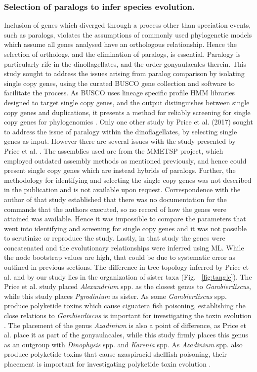 \documentclass[12pt]{article}
\begin{document}
\subsubsection*{Selection of paralogs to infer species evolution.}
\FloatBarrier
Inclusion of genes which diverged through a process other than speciation events, such as paralogs, violates the assumptions of commonly used phylogenetic models which assume all genes analysed have an orthologous relationship.
Hence the selection of orthologs, and the elimination of paralogs, is essential.
Paralogy is particularly rife in the dinoflagellates, and the order gonyaulacales therein. 
This study sought to address the issues arising from paralog comparison by isolating single copy genes, using the curated BUSCO gene collection and software to facilitate the process. 
As BUSCO uses lineage specific profile HMM libraries designed to target single copy genes, and the output distinguishes between single copy genes and duplications, it presents a method for reliably screening for single copy genes for phylogenomics \cite{waterhouse2017busco}.
Only one other study by Price et al. (2017) sought to address the issue of paralogy within the dinoflagellates, by selecting single genes as input. 
However there are several issues with the study presented by Price et al. \cite{price2017robust}. 
The assemblies used are from the MMETSP project, which employed outdated assembly methods as mentioned previously, and hence could present single copy genes which are instead hybrids of paralogs. 
Further, the methodology for identifying and selecting the single copy genes was not described in the publication and is not available upon request. 
Correspondence with the author of that study established that there was no documentation for the commands that the authors executed, so no record of how the genes were attained was available. 
Hence it was impossible to compare the parameters that went into identifying and screening for single copy genes and it was not possible to scrutinize or reproduce the study.
Lastly, in that study the genes were concatenated and the evolutionary relationships were inferred using ML. 
While the node bootstrap values are high, that could be due to systematic error as outlined in previous sections.
The difference in tree topology inferred by Price et al. and by our study lies in the organization of sister taxa (Fig. ~\ref{fig:tangle}). 
The Price et al. study placed \emph{Alexandrium} spp. as the closest genus to \emph{Gambierdiscus}, while this study places \emph{Pyrodinium} as sister. 
As some \emph{Gambierdiscus} spp. produce polyketide toxins which cause ciguatera fish poisoning, establishing the close relations to \emph{Gambierdiscus} is important for investigating the toxin evolution \cite{pawlowiez2014transcriptome}.
The placement of the genus \emph{Azadinium} is also a point of difference, as Price et al. place it as part of the gonyaulacales, while this study firmly places this genus as an outgroup with \emph{Dinophysis} spp. and \emph{Karenia} spp.
As \emph{Azadinium} spp. also produce polyketide toxins that cause azaspiracid shellfish poisoning, their placement is important for investigating polyketide toxin evolution \cite{meyer2015transcriptomic}.
 
\end{document}
